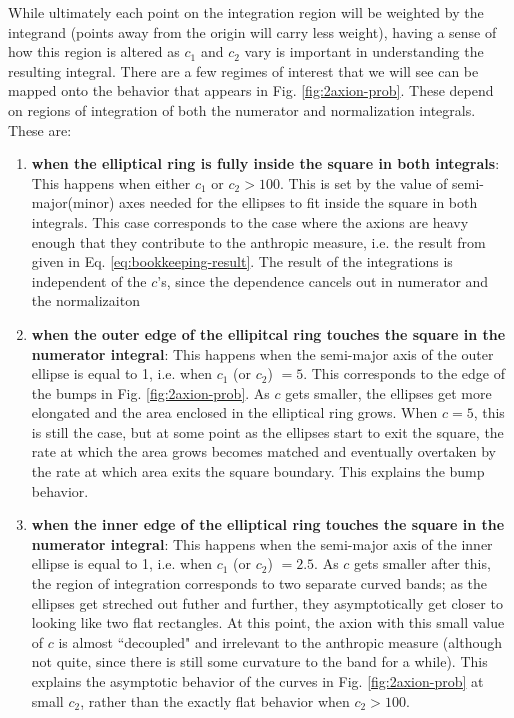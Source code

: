 \documentclass[11pt]{article}
\begin{document}
While ultimately each point on the integration region will be weighted by the integrand (points away from the origin will carry less weight), having a sense of how this region is altered as $c_1$ and $c_2$ vary is important in understanding the resulting integral. There are a few regimes of interest that we will see can be mapped onto the behavior that appears in Fig. \ref{fig:2axion-prob}. These depend on regions of integration of both the numerator and normalization integrals. These are:
\begin{enumerate}
    \item \textbf{when the elliptical ring is fully inside the square in both integrals}: This happens when either $c_1$ or $c_2 > 100$. This is set by the value of semi-major(minor) axes needed for the ellipses to fit inside the square in both integrals. This case corresponds to the case where the axions are heavy enough that they contribute to the anthropic measure, i.e. the result from \cite{exploring-string-axiverse} given in Eq. \eqref{eq:bookkeeping-result}. The result of the integrations is independent of the $c$'s, since the dependence cancels out in numerator and the normalizaiton
    \item \textbf{when the outer edge of the ellipitcal ring touches the square in the numerator integral}: This happens when the semi-major axis of the outer ellipse is equal to 1, i.e. when $c_1$ (or $c_2$) $=5$. This corresponds to the edge of the bumps in Fig. \ref{fig:2axion-prob}. As $c$ gets smaller, the ellipses get more elongated and the area enclosed in the elliptical ring grows. When $c=5$, this is still the case, but at some point as the ellipses start to exit the square, the rate at which the area grows becomes matched and eventually overtaken by the rate at which area exits the square boundary. This explains the bump behavior.
    \item \textbf{when the inner edge of the elliptical ring touches the square in the numerator integral}: This happens when the semi-major axis of the inner ellipse is equal to 1, i.e. when $c_1$ (or $c_2$) $=2.5$. As $c$ gets smaller after this, the region of integration corresponds to two separate curved bands; as the ellipses get streched out futher and further, they asymptotically get closer to looking like two flat rectangles. At this point, the axion with this small value of $c$ is almost ``decoupled" and irrelevant to the anthropic measure (although not quite, since there is still some curvature to the band for a while). This explains the asymptotic behavior of the curves in Fig. \ref{fig:2axion-prob} at small $c_2$, rather than the exactly flat behavior when $c_2>100$.
\end{enumerate}
\end{document}

